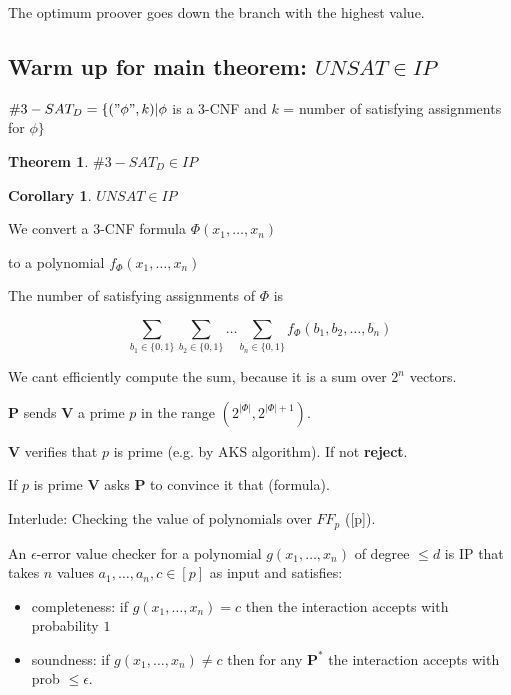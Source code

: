 \documentclass[a4paper,12pt]{article}
\theoremstyle{definition}
\newtheorem{theorem}[counter]{Theorem}
\newtheorem{corollary}[counter]{Corollary}
\theoremstyle{remark}
\begin{document}
The optimum proover goes down the branch with the highest value.

\subsection*{Warm up for main theorem: $UNSAT \in IP$}
$\#3-SAT_D = \{("\phi", k) | \phi$ is a 3-CNF and $k$ = number of satisfying assignments for $\phi\}$

\begin{theorem}
    $\#3-SAT_D \in IP$
\end{theorem}

\begin{corollary}
    $UNSAT \in IP$
\end{corollary}

We convert a 3-CNF formula $\Phi (x_1, \dots, x_n)$


to a polynomial $f_{\Phi} (x_1, \dots, x_n)$

The number of satisfying assignments of $\Phi$ is

\begin{equation*}
    \sum_{b_1 \in \{0, 1\}} \sum_{b_2 \in \{0, 1\}} \dots \sum_{b_n \in \{0, 1\}} f_{\Phi} (b_1, b_2, \dots, b_n)
\end{equation*}

We cant efficiently compute the sum, because it is a sum over $2^n$ vectors.

\textbf{P} sends \textbf{V} a prime $p$ in the range $(2^{|\Phi|}, 2^{|\Phi|+1})$.

\textbf{V} verifies that $p$ is prime (e.g. by AKS algorithm). If not \textbf{reject}.

If $p$ is prime \textbf{V} asks \textbf{P} to convince it that (formula).

Interlude: Checking the value of polynomials over $FF_p$ ([p]).

An $\epsilon$-error value checker for a polynomial $g(x_1, \dots, x_n)$ of degree $\leq d$ is IP that takes $n$ values $a_1, \dots, a_n, c \in [p]$
as input and satisfies:
\begin{itemize}
    \item completeness: if $g(x_1, \dots, x_n) = c$ then the interaction accepts with probability $1$
    \item soundness: if $g(x_1, \dots, x_n) \neq c$ then for any $\textbf{P}^*$ the interaction accepts with prob $\leq \epsilon$.
\end{itemize}
\end{document}
